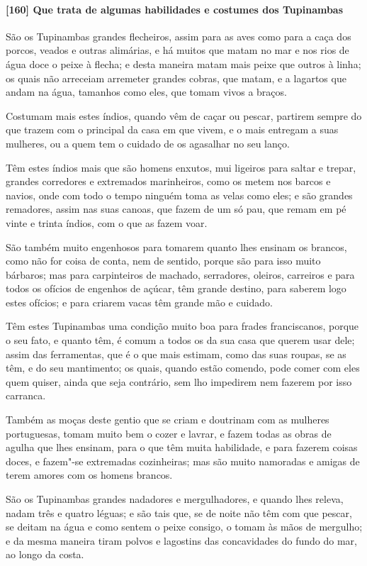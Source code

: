 \paragraph{[160] Que trata de algumas habilidades e costumes dos Tupinambas}\quad
São os Tupinambas grandes flecheiros, assim para as aves como para a caça dos porcos,
veados e outras alimárias, e há muitos que matam no mar e nos rios de água doce o peixe à
flecha; e desta maneira matam mais peixe que outros à linha; os quais não arreceiam
arremeter grandes cobras, que matam, e a lagartos que andam na água, tamanhos como eles,
que tomam vivos a braços.

Costumam mais estes índios, quando vêm de caçar ou pescar, partirem sempre do que trazem
com o principal da casa em que vivem, e o mais entregam a suas mulheres, ou a quem tem o
cuidado de os agasalhar no seu lanço.

Têm estes índios mais que são homens enxutos, mui ligeiros para saltar e trepar, grandes
corredores e extremados marinheiros, como os metem nos barcos e navios, onde com todo o
tempo ninguém toma as velas como eles; e são grandes remadores, assim nas suas canoas, que
fazem de um só pau, que remam em pé vinte e trinta índios, com o que as fazem voar.

São também muito engenhosos para tomarem quanto lhes ensinam os brancos, como não for
coisa de conta, nem de sentido, porque são para isso muito bárbaros; mas para carpinteiros
de machado, serradores, oleiros, carreiros e para todos os ofícios de engenhos de açúcar,
têm grande destino, para saberem logo estes ofícios; e para criarem vacas têm grande mão e
cuidado.

Têm estes Tupinambas uma condição muito boa para frades franciscanos, porque o seu fato, e
quanto têm, é comum a todos os da sua casa que querem usar dele; assim das ferramentas,
que é o que mais estimam, como das suas roupas, se as têm, e do seu mantimento; os quais,
quando estão comendo, pode comer com eles quem quiser, ainda que seja contrário, sem lho
impedirem nem fazerem por isso carranca.

Também as moças deste gentio que se criam e doutrinam com as mulheres portuguesas, tomam
muito bem o cozer e lavrar, e fazem todas as obras de agulha que lhes ensinam, para o que
têm muita habilidade, e para fazerem coisas doces, e fazem"-se extremadas cozinheiras; mas
são muito namoradas e amigas de terem amores com os homens brancos.

São os Tupinambas grandes nadadores e mergulhadores, e quando lhes releva, nadam três e
quatro léguas; e são tais que, se de noite não têm com que pescar, se deitam na água e
como sentem o peixe consigo, o tomam às mãos de mergulho; e da mesma maneira tiram polvos
e lagostins das concavidades do fundo do mar, ao longo da costa.

